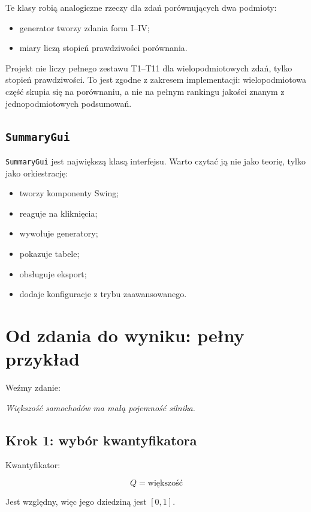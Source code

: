 \documentclass[11pt,a4paper]{article}
\newcommand{\code}[1]{\texttt{#1}}
\begin{document}
Te klasy robią analogiczne rzeczy dla zdań porównujących dwa podmioty:

\begin{itemize}
    \item generator tworzy zdania form I--IV;
    \item miary liczą stopień prawdziwości porównania.
\end{itemize}

Projekt nie liczy pełnego zestawu T1--T11 dla wielopodmiotowych zdań, tylko stopień prawdziwości. To jest zgodne z zakresem implementacji: wielopodmiotowa część skupia się na porównaniu, a nie na pełnym rankingu jakości znanym z jednopodmiotowych podsumowań.

\subsection{\code{SummaryGui}}

\code{SummaryGui} jest największą klasą interfejsu. Warto czytać ją nie jako teorię, tylko jako orkiestrację:

\begin{itemize}
    \item tworzy komponenty Swing;
    \item reaguje na kliknięcia;
    \item wywołuje generatory;
    \item pokazuje tabele;
    \item obsługuje eksport;
    \item dodaje konfiguracje z trybu zaawansowanego.
\end{itemize}

\section{Od zdania do wyniku: pełny przykład}

Weźmy zdanie:

\begin{center}
\emph{Większość samochodów ma małą pojemność silnika.}
\end{center}

\subsection{Krok 1: wybór kwantyfikatora}

Kwantyfikator:

\[
Q=\text{większość}
\]

Jest względny, więc jego dziedziną jest \([0,1]\).
\end{document}
